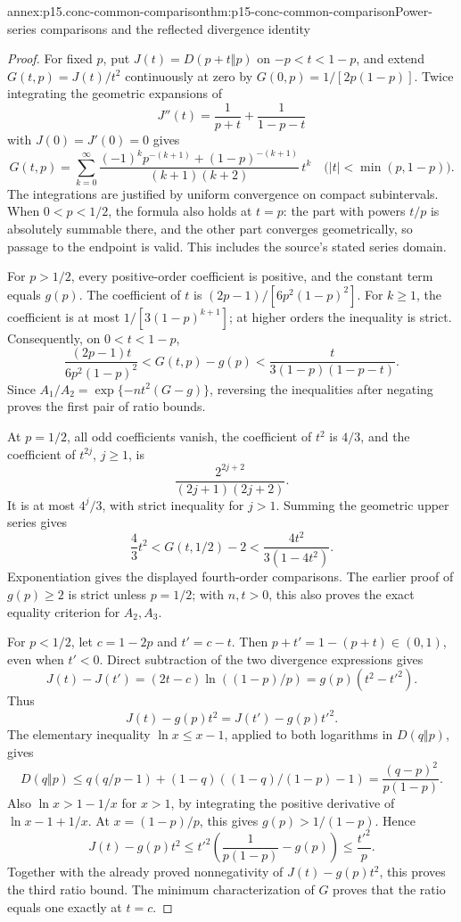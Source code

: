 \begin{annexitem}{annex:p15.conc-common-comparison}{thm:p15-conc-common-comparison}{Power-series comparisons and the reflected divergence identity}
\begin{proof}
For fixed \(p\), put \(J(t)=D(p+t\Vert p)\) on
\(-p<t<1-p\), and extend \(G(t,p)=J(t)/t^2\) continuously
at zero by \(G(0,p)=1/[2p(1-p)]\).
Twice integrating the geometric expansions of
\[
                 J''(t)=\frac1{p+t}+\frac1{1-p-t}
\]
with \(J(0)=J'(0)=0\) gives
\[
 G(t,p)=\sum_{k=0}^{\infty}
 \frac{(-1)^kp^{-(k+1)}+(1-p)^{-(k+1)}}
      {(k+1)(k+2)}\,t^k
                  \quad\bigl(|t|<\min(p,1-p)\bigr).
\]
The integrations are justified by uniform convergence on
compact subintervals. When \(0<p<1/2\), the formula
also holds at \(t=p\): the part with powers \(t/p\)
is absolutely summable there, and the other part
converges geometrically, so passage to the endpoint
is valid. This includes the source's stated series domain.

For \(p>1/2\), every positive-order coefficient is
positive, and the constant term equals \(g(p)\).
The coefficient of \(t\) is
\((2p-1)/[6p^2(1-p)^2]\).
For \(k\geq1\), the coefficient is at most
\(1/[3(1-p)^{k+1}]\); at higher orders the inequality
is strict. Consequently, on \(0<t<1-p\),
\[
 \frac{(2p-1)t}{6p^2(1-p)^2}
       <G(t,p)-g(p)
       <\frac{t}{3(1-p)(1-p-t)}.
\]
Since \(A_1/A_2=\exp\{-nt^2(G-g)\}\), reversing
the inequalities after negating proves the first pair
of ratio bounds.

At \(p=1/2\), all odd coefficients vanish, the
coefficient of \(t^2\) is \(4/3\), and the coefficient
of \(t^{2j}\), \(j\geq1\), is
\[
                       \frac{2^{2j+2}}{(2j+1)(2j+2)}.
\]
It is at most \(4^j/3\), with strict inequality for
\(j>1\). Summing the geometric upper series gives
\[
          \frac43t^2<G(t,1/2)-2<
                    \frac{4t^2}{3(1-4t^2)}.
\]
Exponentiation gives the displayed fourth-order comparisons.
The earlier proof of \(g(p)\geq2\) is strict unless
\(p=1/2\); with \(n,t>0\), this also proves the exact
equality criterion for \(A_2,A_3\).

For \(p<1/2\), let \(c=1-2p\) and \(t'=c-t\).
Then \(p+t'=1-(p+t)\in(0,1)\), even when \(t'<0\).
Direct subtraction of the two divergence expressions gives
\[
 J(t)-J(t')=(2t-c)\ln((1-p)/p)
                    =g(p)(t^2-t'^2).
\]
Thus
\[
                 J(t)-g(p)t^2=J(t')-g(p)t'^2.
\]
The elementary inequality \(\ln x\leq x-1\),
applied to both logarithms in \(D(q\Vert p)\), gives
\[
 D(q\Vert p)\leq
 q(q/p-1)+(1-q)((1-q)/(1-p)-1)
               =\frac{(q-p)^2}{p(1-p)}.
\]
Also \(\ln x>1-1/x\) for \(x>1\), by integrating
the positive derivative of \(\ln x-1+1/x\).
At \(x=(1-p)/p\), this gives \(g(p)>1/(1-p)\).
Hence
\[
 J(t)-g(p)t^2
   \leq t'^2\left(\frac1{p(1-p)}-g(p)\right)
   \leq\frac{t'^2}{p}.
\]
Together with the already proved nonnegativity of
\(J(t)-g(p)t^2\), this proves the third ratio bound.
The minimum characterization of \(G\) proves that
the ratio equals one exactly at \(t=c\).


\end{proof}
\end{annexitem}
